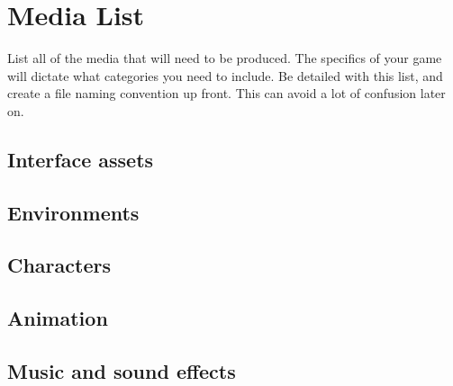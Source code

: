 \chapter{Media List}
List all of the media that will need to be produced. The specifics of your game will dictate what categories you need to include. Be detailed with this list, and create a file naming convention up front. This can avoid a lot of confusion later on.

\section{Interface assets} %

\section{Environments} %

\section{Characters} %

\section{Animation} %

\section{Music and sound effects} %
